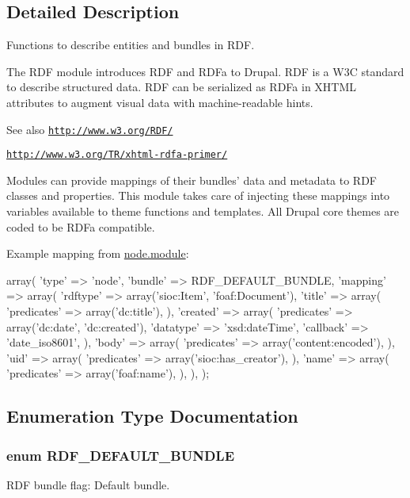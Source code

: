 \subsection{Detailed Description}
Functions to describe entities and bundles in RDF.

The RDF module introduces RDF and RDFa to Drupal. RDF is a W3C standard to describe structured data. RDF can be serialized as RDFa in XHTML attributes to augment visual data with machine-\/readable hints. \begin{DoxySeeAlso}{See also}
\href{http://www.w3.org/RDF/}{\tt http://www.w3.org/RDF/} 

\href{http://www.w3.org/TR/xhtml-rdfa-primer/}{\tt http://www.w3.org/TR/xhtml-\/rdfa-\/primer/}
\end{DoxySeeAlso}
Modules can provide mappings of their bundles' data and metadata to RDF classes and properties. This module takes care of injecting these mappings into variables available to theme functions and templates. All Drupal core themes are coded to be RDFa compatible.

Example mapping from \hyperlink{node_8module}{node.module}: 
\begin{DoxyCode}
   array(
     'type' => 'node',
     'bundle' => RDF_DEFAULT_BUNDLE,
     'mapping' => array(
       'rdftype' => array('sioc:Item', 'foaf:Document'),
       'title' => array(
         'predicates' => array('dc:title'),
       ),
       'created' => array(
         'predicates' => array('dc:date', 'dc:created'),
         'datatype' => 'xsd:dateTime',
         'callback' => 'date_iso8601',
       ),
      'body' => array(
         'predicates' => array('content:encoded'),
       ),
       'uid' => array(
         'predicates' => array('sioc:has_creator'),
       ),
       'name' => array(
         'predicates' => array('foaf:name'),
       ),
     ),
   );
\end{DoxyCode}
 

\subsection{Enumeration Type Documentation}
\hypertarget{group__rdf_ga4f749985c55ac04563d6446524062ac9}{
\subsubsection[{RDF\_\-DEFAULT\_\-BUNDLE}]{\setlength{\rightskip}{0pt plus 5cm}enum {\bf RDF\_\-DEFAULT\_\-BUNDLE}}}
\label{group__rdf_ga4f749985c55ac04563d6446524062ac9}
RDF bundle flag: Default bundle.


